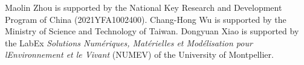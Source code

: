 \documentclass[11pt,a4paper]{article}
\numberwithin{equation}{section}
\numberwithin{figure}{section}
\newcommand\beaa{\begin{eqnarray*}}
\newcommand\eeaa{\end{eqnarray*}}
\begin{document}





\bigskip

Maolin Zhou is supported by the National Key Research and Development Program of China (2021YFA1002400).
Chang-Hong Wu is supported by the Ministry of Science and Technology of Taiwan.
Dongyuan Xiao is supported by the LabEx {\it Solutions Num\'{e}riques, Mat\'{e}rielles et Mod\'{e}lisation pour lEnvironnement et le Vivant} (NUMEV) of the University of Montpellier.
\end{document}
